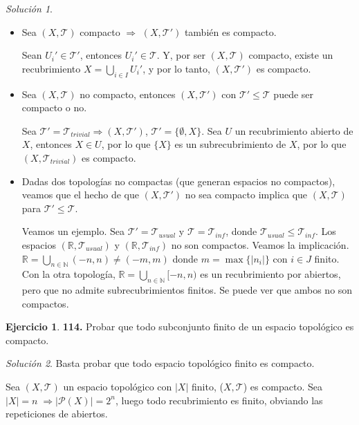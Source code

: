 \documentclass[12pt,twoside]{report}
\newcommand\mc[1]{\mathcal{#1}}
\theoremstyle{azul}
\theoremstyle{azul2}
\theoremstyle{plain}
\theoremstyle{definition}
\newtheorem*{ejern}{Ejercicio}
\theoremstyle{remark}
\newtheorem*{sol}{Solución}
\begin{document}
\begin{sol} \; \vspace{-7mm}
\begin{itemize}
    \item Sea $(X,\mc{T})$ compacto $\Rightarrow$ $(X,\mc{T}')$ tambi{\'e}n es compacto.
    
     Sean $U_i' \in \mc{T}'$, entonces $U_i' \in \mc{T}$. Y, por ser $(X, \mc{T})$ compacto, existe un recubrimiento $X=\underset{i \in I}{\bigcup} U_i '$, y por lo tanto, $(X, \mc{T}')$ es compacto.
     
     \item Sea $(X,\mc{T})$ no compacto, entonces $(X, \mc{T}')$ con $\mc{T}' \leq \mc{T}$ puede ser compacto o no.
     
     Sea $\mc{T}'=\mc{T}_{trivial} \Rightarrow (X, \mc{T}')$, $\mc{T}'=\{\emptyset, X\}$. Sea $U$ un recubrimiento abierto de $X$, entonces $X \in U$, por lo que $\{X\}$ es un subrecubrimiento de $X$, por lo que $(X, \mc{T}_{trivial})$ es compacto. 
     
     \item Dadas dos topologías no compactas (que generan espacios no compactos), veamos que el hecho de que $(X,\mc{T}')$ no sea compacto implica que $(X,\mc{T})$ para $\mc{T}' \leq \mc{T}$.
     
     Veamos un ejemplo. Sea $\mc{T}'=\mc{T}_{usual}$ y $\mc{T}=\mc{T}_{inf}$, donde $\mc{T}_{usual} \leq \mc{T}_{inf}$. Los espacios $(\mathbb{R},\mc{T}_{usual} )$ y $(\mathbb{R},\mc{T}_{inf} )$ no son compactos. Veamos la implicación. $\mathbb{R} = \underset{n \in \mathbb{N}}{\bigcup}(-n,n) \neq (-m,m)$ donde $m=\max\{|n_i|\}$ con $i \in J$ finito. Con la otra topología, $\mathbb{R}=\underset{n \in \mathbb{N}}{\bigcup}[-n,n) $ es un recubrimiento por abiertos, pero que no admite subrecubrimientos finitos. Se puede ver que ambos no son compactos.
\end{itemize}
\end{sol}
\; \vspace{-5mm}
\begin{ejern} \label{ej114} \textbf{114.} Probar que todo subconjunto finito de un espacio topológico es compacto. 
\end{ejern}
\begin{sol}
Basta probar que todo espacio topológico finito es compacto. 

Sea $(X, \mc{T})$ un espacio topológico con $|X|$ finito, ($X, \mc{T}$) es compacto. Sea $|X|=n \; \Rightarrow |\mc{P}(X)| = 2^n$, luego todo recubrimiento es finito, obviando las repeticiones de abiertos. 
\end{sol}
\end{document}
